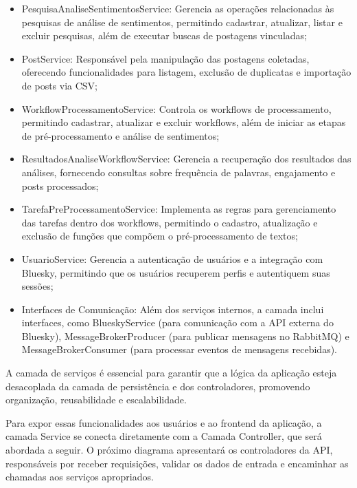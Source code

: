 \documentclass[
	12pt,				%
	oneside,			%
	a4paper,			%
	english,			%
	french,				%
	spanish,			%
	brazil				%
	]{abntex2}
\begin{document}
\begin{itemize}
\tightlist
\item
  PesquisaAnaliseSentimentosService: Gerencia as operações relacionadas
  às pesquisas de análise de sentimentos, permitindo cadastrar,
  atualizar, listar e excluir pesquisas, além de executar buscas de
  postagens vinculadas;
\item
  PostService: Responsável pela manipulação das postagens coletadas,
  oferecendo funcionalidades para listagem, exclusão de duplicatas e
  importação de posts via CSV;
\item
  WorkflowProcessamentoService: Controla os workflows de processamento,
  permitindo cadastrar, atualizar e excluir workflows, além de iniciar
  as etapas de pré-processamento e análise de sentimentos;
\item
  ResultadosAnaliseWorkflowService: Gerencia a recuperação dos
  resultados das análises, fornecendo consultas sobre frequência de
  palavras, engajamento e posts processados;
\item
  TarefaPreProcessamentoService: Implementa as regras para gerenciamento
  das tarefas dentro dos workflows, permitindo o cadastro, atualização e
  exclusão de funções que compõem o pré-processamento de textos;
\item
  UsuarioService: Gerencia a autenticação de usuários e a integração com
  Bluesky, permitindo que os usuários recuperem perfis e autentiquem
  suas sessões;
\item
  Interfaces de Comunicação: Além dos serviços internos, a camada inclui
  interfaces, como BlueskyService (para comunicação com a API externa do
  Bluesky), MessageBrokerProducer (para publicar mensagens no RabbitMQ)
  e MessageBrokerConsumer (para processar eventos de mensagens
  recebidas).
\end{itemize}

A camada de serviços é essencial para garantir que a lógica da aplicação
esteja desacoplada da camada de persistência e dos controladores,
promovendo organização, reusabilidade e escalabilidade.

Para expor essas funcionalidades aos usuários e ao frontend da
aplicação, a camada Service se conecta diretamente com a Camada
Controller, que será abordada a seguir. O próximo diagrama apresentará
os controladores da API, responsáveis por receber requisições, validar
os dados de entrada e encaminhar as chamadas aos serviços apropriados.
\end{document}
